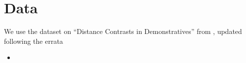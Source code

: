 \documentclass[a4paper]{article}
\begin{document}
\section{Data}

We use the dataset on ``Distance Contrasts in Demonstratives'' from \cite{wals-41},
updated following the errata
\begin{itemize}
\item \cite[issue 87]{clld-wals-data2016}
\end{itemize}



\end{document}

